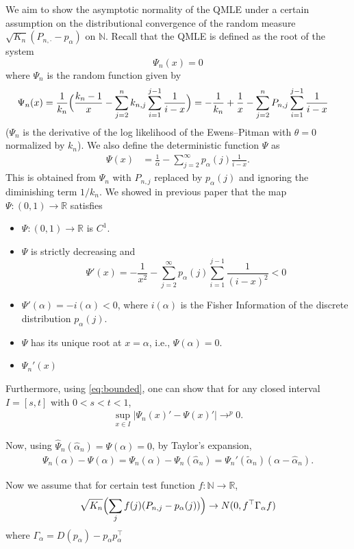 \documentclass{article}
\begin{document}
We aim to show the asymptotic normality of the QMLE under a certain assumption on the distributional convergence of the random measure $\sqrt{K_n} (P_{n,\cdot}-p_{\alpha})$ on $\mathbb{N}$. 
Recall that the QMLE is defined as the root of the system 
$$
\Psi_n(x) = 0
$$
where $\Psi_n$ is the random function given by 
\begin{align*}
    \Psi_n(x) &= \frac{1}{k_n} \Bigl(\frac{k_n - 1}{x} - \sum_{j=2}^{n} k_{n,j} \sum_{i=1}^{j-1} \frac{1}{i - x}\Bigr) = -\frac{1}{k_n} + \frac{1}{x} - \sum_{j=2}^n P_{n,j} \sum_{i=1}^{j-1} \frac{1}{i - x}
\end{align*}
($\Psi_n$ is the derivative of the log likelihood of the Ewens--Pitman with $\theta=0$ normalized by $k_n$). We also define the deterministic function $\Psi$ as 
\begin{align*}
\Psi(x) &= \frac{1}{\alpha} - \sum_{j=2}^\infty p_{\alpha}(j) \frac{1}{i-x}.
\end{align*}
This is obtained from $\Psi_n$ with $P_{n,j}$ replaced by $p_\alpha(j)$ and ignoring the diminishing term $1/k_n$. We showed in previous paper that the map 
$\Psi:(0,1)\to\mathbb{R}$ satisfies 
\begin{itemize}
    \item $\Psi:(0,1)\to\mathbb{R}$ is $C^1$. 
    \item $\Psi$ is strictly decreasing and 
    $$   
    \Psi'(x)=-\frac{1}{x^2} - \sum_{j=2}^\infty p_\alpha(j) \sum_{i=1}^{j-1}\frac{1}{(i-x)^2}<0
    $$
    \item $\Psi'(\alpha)=-{i}(\alpha) < 0$, where ${i}(\alpha)$ is the Fisher Information of the discrete distribution $p_\alpha(j)$. 
    \item $\Psi$ has its unique root at $x=\alpha$, i.e., $\Psi(\alpha)=0$.
    \item $\Psi_n'(x)$
\end{itemize}
Furthermore, using \eqref{eq:bounded}, one can show that for any closed interval $I=[s,t]$ with $0<s<t<1$, 
\begin{align*}
 \sup_{x\in I}|\Psi_n(x)'- \Psi(x)'|\to^p 0. 
\end{align*}

Now, using $\hat{\Psi}_n(\hat{\alpha}_n)=\Psi(\alpha)=0$, by Taylor's expansion, 
\begin{align*}
    \Psi_n(\alpha) - \Psi(\alpha) = \Psi_n(\alpha)-\Psi_n(\hat{\alpha}_n) = \Psi_n'(\tilde{\alpha}_n) (\alpha-\hat\alpha_n).
\end{align*}


Now we assume that for certain test function $f:\mathbb{N}\to\mathbb{R}$, 
$$
\sqrt{K_n} \Bigl(\sum_j f(j) (P_{n,j} - p_\alpha(j))\Bigr) \to N(0, f^\top \Gamma_\alpha f) 
$$
where $\Gamma_\alpha = D(p_{\alpha}) - p_{\alpha} p_{\alpha}^\top$
\end{document}
